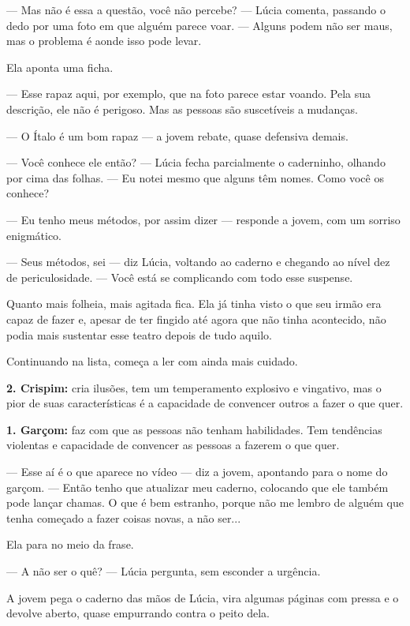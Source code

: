 — Mas não é essa a questão, você não percebe? — Lúcia comenta, passando o dedo por uma foto em que alguém parece voar. — Alguns podem não ser maus, mas o problema é aonde isso pode levar.

Ela aponta uma ficha.

— Esse rapaz aqui, por exemplo, que na foto parece estar voando. Pela sua descrição, ele não é perigoso. Mas as pessoas são suscetíveis a mudanças.

— O Ítalo é um bom rapaz — a jovem rebate, quase defensiva demais.

— Você conhece ele então? — Lúcia fecha parcialmente o caderninho, olhando por cima das folhas. — Eu notei mesmo que alguns têm nomes. Como você os conhece?

— Eu tenho meus métodos, por assim dizer — responde a jovem, com um sorriso enigmático.

— Seus métodos, sei — diz Lúcia, voltando ao caderno e chegando ao nível dez de periculosidade. — Você está se complicando com todo esse suspense.

Quanto mais folheia, mais agitada fica.  
Ela já tinha visto o que seu irmão era capaz de fazer e, apesar de ter fingido até agora que não tinha acontecido, não podia mais sustentar esse teatro depois de tudo aquilo.

Continuando na lista, começa a ler com ainda mais cuidado.

\medskip

\noindent
\textbf{2. Crispim:} cria ilusões, tem um temperamento explosivo e vingativo, mas o pior de suas características é a capacidade de convencer outros a fazer o que quer.

\medskip

\noindent
\textbf{1. Garçom:} faz com que as pessoas não tenham habilidades. Tem tendências violentas e capacidade de convencer as pessoas a fazerem o que quer.

\medskip

— Esse aí é o que aparece no vídeo — diz a jovem, apontando para o nome do garçom. — Então tenho que atualizar meu caderno, colocando que ele também pode lançar chamas. O que é bem estranho, porque não me lembro de alguém que tenha começado a fazer coisas novas, a não ser...

Ela para no meio da frase.

— A não ser o quê? — Lúcia pergunta, sem esconder a urgência.

A jovem pega o caderno das mãos de Lúcia, vira algumas páginas com pressa e o devolve aberto, quase empurrando contra o peito dela.

